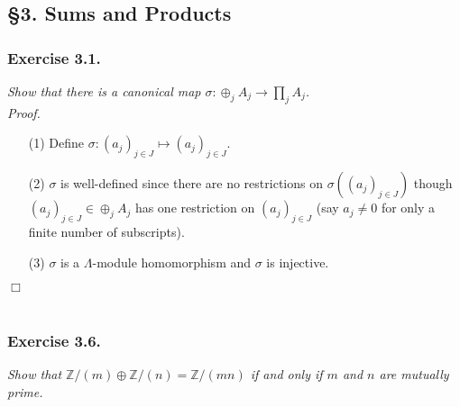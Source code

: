\documentclass{article}
\begin{document}



\subsection*{\S 3. Sums and Products \\}



\subsubsection*{Exercise 3.1.}
\emph{Show that there is a canonical map $\sigma: \oplus_{j} A_j \to \prod_j A_j$.} \\



\emph{Proof.}
\begin{enumerate}
\item[(1)]
  Define $\sigma: (a_j)_{j \in J} \mapsto (a_j)_{j \in J}$.

\item[(2)]
  $\sigma$ is well-defined since there are no restrictions on $\sigma((a_j)_{j \in J})$
  though $(a_j)_{j \in J} \in \oplus_{j} A_j$ has one restriction on $(a_j)_{j \in J}$
  (say $a_j \neq 0$ for only a finite number of subscripts).

\item[(3)]
  $\sigma$ is a $\Lambda$-module homomorphism and $\sigma$ is injective.
\end{enumerate}
$\Box$ \\\\






\subsubsection*{Exercise 3.6.}
\emph{Show that $\mathbb{Z}/(m) \oplus \mathbb{Z}/(n) = \mathbb{Z}/(mn)$
if and only if $m$ and $n$ are mutually prime.} \\
\end{document}
